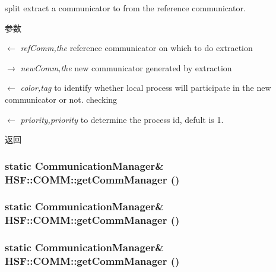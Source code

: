 split extract a communicator to from the reference communicator. 
\begin{DoxyParams}{参数}
\item[\mbox{$\leftarrow$} {\em refComm,the}]reference communicator on which to do extraction \item[\mbox{$\rightarrow$} {\em newComm,the}]new communicator generated by extraction \item[\mbox{$\leftarrow$} {\em color,tag}]to identify whether local process will participate in the new communicator or not. checking \item[\mbox{$\leftarrow$} {\em priority,priority}]to determine the process id, defult is 1. \end{DoxyParams}
\begin{DoxyReturn}{返回}

\end{DoxyReturn}
\hypertarget{classHSF_1_1COMM_a73b9e5bcef8100fa37a940c2dd744c7b}{
\subsubsection[{getCommManager}]{\setlength{\rightskip}{0pt plus 5cm}static {\bf CommunicationManager}\& HSF::COMM::getCommManager ()}}
\label{classHSF_1_1COMM_a73b9e5bcef8100fa37a940c2dd744c7b}
\hypertarget{classHSF_1_1COMM_a73b9e5bcef8100fa37a940c2dd744c7b}{
\subsubsection[{getCommManager}]{\setlength{\rightskip}{0pt plus 5cm}static {\bf CommunicationManager}\& HSF::COMM::getCommManager ()}}
\label{classHSF_1_1COMM_a73b9e5bcef8100fa37a940c2dd744c7b}
\hypertarget{classHSF_1_1COMM_a73b9e5bcef8100fa37a940c2dd744c7b}{
\subsubsection[{getCommManager}]{\setlength{\rightskip}{0pt plus 5cm}static {\bf CommunicationManager}\& HSF::COMM::getCommManager ()}}
